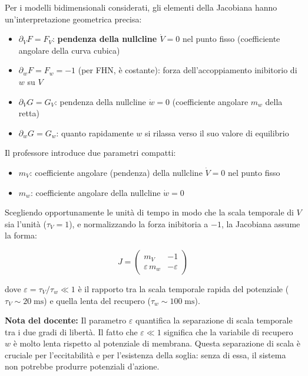 Per i modelli bidimensionali considerati, gli elementi della Jacobiana hanno un'interpretazione geometrica precisa:

\begin{itemize}
    \item $\partial_V F = F_V$: \textbf{pendenza della nullcline $\dot{V} = 0$} nel punto fisso (coefficiente angolare della curva cubica)
    \item $\partial_w F = F_w = -1$ (per FHN, è costante): forza dell'accoppiamento inibitorio di $w$ su $V$
    \item $\partial_V G = G_V$: pendenza della nullcline $\dot{w} = 0$ (coefficiente angolare $m_w$ della retta)
    \item $\partial_w G = G_w$: quanto rapidamente $w$ si rilassa verso il suo valore di equilibrio
\end{itemize}

Il professore introduce due parametri compatti:
\begin{itemize}
    \item $m_V$: coefficiente angolare (pendenza) della nullcline $\dot{V} = 0$ nel punto fisso
    \item $m_w$: coefficiente angolare della nullcline $\dot{w} = 0$
\end{itemize}

Scegliendo opportunamente le unità di tempo in modo che la scala temporale di $V$ sia l'unità ($\tau_V = 1$), e normalizzando la forza inibitoria a $-1$, la Jacobiana assume la forma:

\begin{equation}
J = \begin{pmatrix} m_V & -1 \\ \varepsilon \, m_w & -\varepsilon \end{pmatrix}
\end{equation}

dove $\varepsilon = \tau_V / \tau_w \ll 1$ è il rapporto tra la scala temporale rapida del potenziale ($\tau_V \sim 20 \; \text{ms}$) e quella lenta del recupero ($\tau_w \sim 100 \; \text{ms}$).

\begin{tcolorbox}[colback=gray!5, colframe=gray!40, arc=2mm, boxrule=0.5pt]
\textbf{Nota del docente:} Il parametro $\varepsilon$ quantifica la separazione di scala temporale tra i due gradi di libertà. Il fatto che $\varepsilon \ll 1$ significa che la variabile di recupero $w$ è molto lenta rispetto al potenziale di membrana. Questa separazione di scala è cruciale per l'eccitabilità e per l'esistenza della soglia: senza di essa, il sistema non potrebbe produrre potenziali d'azione.
\end{tcolorbox}



